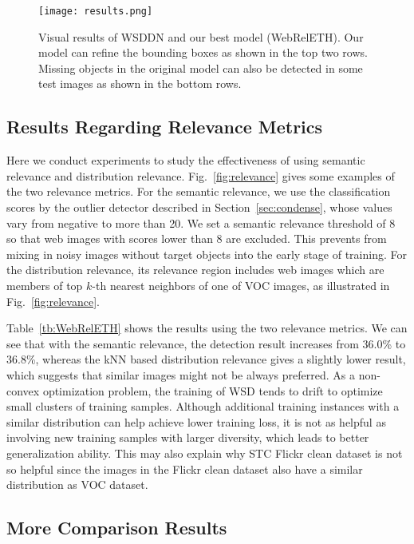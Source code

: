 \documentclass[10pt,twocolumn,letterpaper]{article}
\begin{document}
\begin{figure*}[h!]
\centering
\texttt{[image: results.png]}
\caption{Visual results of WSDDN and our best model (WebRelETH). Our model can refine the bounding boxes as shown in the top two rows. Missing objects in the original model can also be detected in some test images as shown in the bottom rows. }
\label{fig:results}
\end{figure*}

\subsection {Results Regarding Relevance Metrics}
Here we conduct experiments to study the effectiveness of using semantic relevance and distribution relevance. Fig.~\ref{fig:relevance} gives some examples of the two relevance metrics. For the semantic relevance, we use the classification scores by the outlier detector described in Section~\ref{sec:condense}, whose values vary from negative to more than 20. We set a semantic relevance threshold of 8 so that web images with scores lower than 8 are excluded. This prevents from mixing in noisy images without target objects into the early stage of training. For the distribution relevance, its relevance region includes web images which are members of top $k$-th nearest neighbors of one of VOC images, as illustrated in Fig.~\ref{fig:relevance}.


Table~\ref{tb:WebRelETH} shows the results using the two relevance metrics. We can see that with the semantic relevance, the detection result increases from 36.0\% to 36.8\%, whereas the kNN based distribution relevance gives a slightly lower result, which suggests that similar images might not be always preferred. As a non-convex optimization problem, the training of WSD tends to drift to optimize small clusters of training samples. Although additional training instances with a similar distribution can help achieve lower training loss, it is not as helpful as involving new training samples with larger diversity, which leads to better generalization ability. This may also explain why STC Flickr clean dataset is not so helpful since the images in the Flickr clean dataset also have a similar distribution as VOC dataset. 



\subsection {More Comparison Results}
\end{document}
